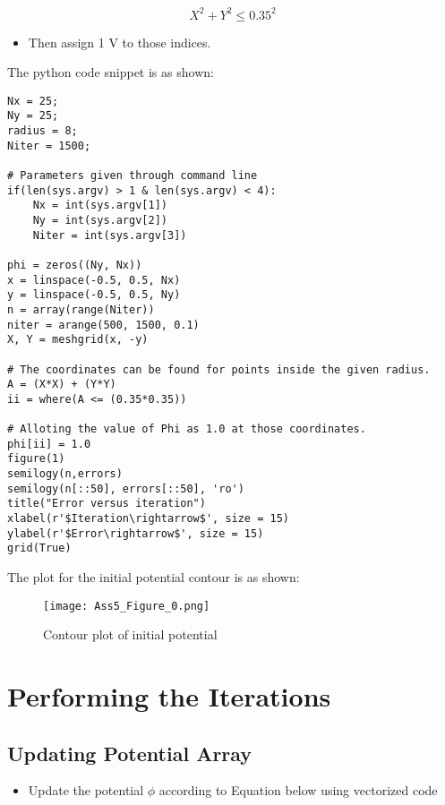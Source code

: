 \documentclass[11pt, a4paper]{article}
\begin{document}
\begin{equation}
X ^2 +Y ^2 \leq	 0.35^2
\end{equation}

\begin{itemize}
\item
  Then assign 1 V to those indices.

\end{itemize}

The python code snippet is as shown:
\begin{verbatim}
Nx = 25; 
Ny = 25; 
radius = 8;	
Niter = 1500;  

# Parameters given through command line
if(len(sys.argv) > 1 & len(sys.argv) < 4):
	Nx = int(sys.argv[1])
	Ny = int(sys.argv[2])
	Niter = int(sys.argv[3])
   
phi = zeros((Ny, Nx)) 
x = linspace(-0.5, 0.5, Nx) 
y = linspace(-0.5, 0.5, Ny)
n = array(range(Niter))
niter = arange(500, 1500, 0.1) 
X, Y = meshgrid(x, -y) 

# The coordinates can be found for points inside the given radius.
A = (X*X) + (Y*Y)
ii = where(A <= (0.35*0.35))

# Alloting the value of Phi as 1.0 at those coordinates.
phi[ii] = 1.0
figure(1)
semilogy(n,errors)
semilogy(n[::50], errors[::50], 'ro')
title("Error versus iteration")
xlabel(r'$Iteration\rightarrow$', size = 15)
ylabel(r'$Error\rightarrow$', size = 15)
grid(True)
       \end{verbatim}
       
The plot for the initial potential contour is as shown:
	     \begin{figure}[!tbh]
        \centering
        \texttt{[image: Ass5\_Figure\_0.png]}  
        \caption{Contour plot of initial potential}
   \end{figure}
 	\newpage
 \section{Performing the Iterations}
 \subsection{Updating Potential Array}

   \begin{itemize}
   
   \item
    Update the potential \(\phi\) according to Equation below using
     vectorized code
   \end{itemize}
   
\end{document}
